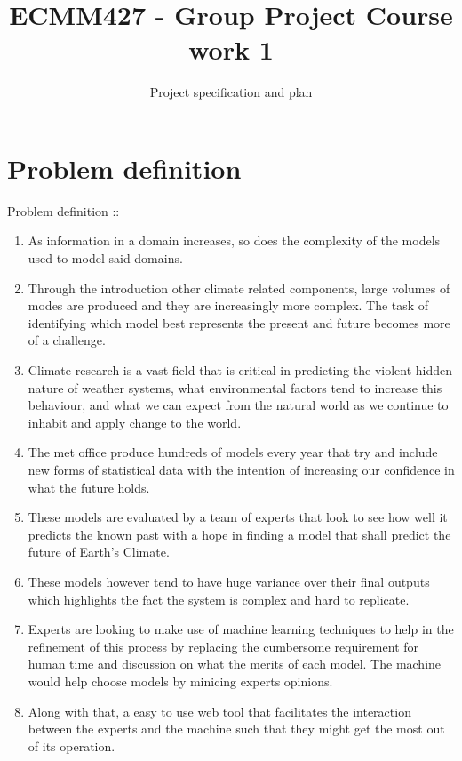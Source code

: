 \documentclass[11pt]{article} %
\title{ECMM427 - Group Project Course work 1}
\author{Project specification and plan}
\numberwithin{equation}{section}
\begin{document}
\pagestyle{empty}
\tableofcontents
\clearpage
\pagestyle{fancy}
\setcounter{page}{1}
\maketitle

\section{Problem definition}


Problem definition ::
\begin{enumerate}
\item As information in a domain increases, so does the complexity of the models used to model said domains.
\item Through the introduction other climate related components, large volumes of modes are produced and they are increasingly more complex. The task of identifying which model best represents the present and future becomes more of a challenge.
\item Climate research is a vast field that is critical in predicting the violent hidden nature of weather systems, what environmental factors tend to increase this behaviour, and what we can expect from the natural world as we continue to inhabit and apply change to the world.
\item The met office produce hundreds of models every year that try and include new forms of statistical data with the intention of increasing our confidence in what the future holds.
\item These models are evaluated by a team of experts that look to see how well it predicts the known past with a hope in finding a model that shall predict the future of Earth's Climate.
\item These models however tend to have huge variance over their final outputs which highlights the fact the system is complex and hard to replicate.
\item Experts are looking to make use of machine learning techniques to help in the refinement of this process by replacing the cumbersome requirement for human time and discussion on what the merits of each model. The machine would help choose models by minicing experts opinions.
\item Along with that, a easy to use web tool that facilitates the interaction between the experts and the machine such that they might get the most out of its operation.
\end{enumerate}
\end{document}
